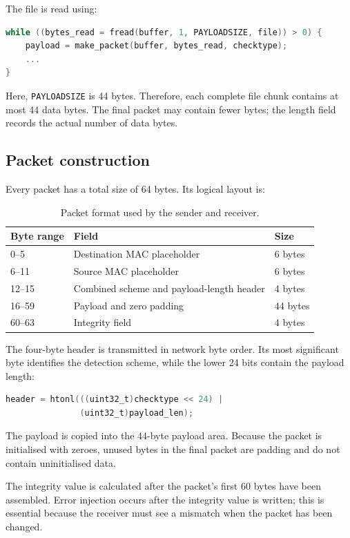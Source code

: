 \documentclass[12pt,a4paper]{article}
\begin{document}
The file is read using:

\begin{lstlisting}[language=C]
while ((bytes_read = fread(buffer, 1, PAYLOADSIZE, file)) > 0) {
    payload = make_packet(buffer, bytes_read, checktype);
    ...
}
\end{lstlisting}

Here, \texttt{PAYLOADSIZE} is 44 bytes. Therefore, each complete file chunk
contains at most 44 data bytes. The final packet may contain fewer bytes;
the length field records the actual number of data bytes.

\subsection{Packet construction}

Every packet has a total size of 64 bytes. Its logical layout is:

\begin{table}[H]
\centering
\begin{tabular}{lll}
\toprule
\textbf{Byte range} & \textbf{Field} & \textbf{Size} \\
\midrule
0--5 & Destination MAC placeholder & 6 bytes \\
6--11 & Source MAC placeholder & 6 bytes \\
12--15 & Combined scheme and payload-length header & 4 bytes \\
16--59 & Payload and zero padding & 44 bytes \\
60--63 & Integrity field & 4 bytes \\
\bottomrule
\end{tabular}
\caption{Packet format used by the sender and receiver.}
\end{table}

The four-byte header is transmitted in network byte order. Its most
significant byte identifies the detection scheme, while the lower 24 bits
contain the payload length:

\begin{lstlisting}[language=C]
header = htonl(((uint32_t)checktype << 24) |
               (uint32_t)payload_len);
\end{lstlisting}

The payload is copied into the 44-byte payload area. Because the packet is
initialised with zeroes, unused bytes in the final packet are padding and do
not contain uninitialised data.

The integrity value is calculated after the packet's first 60 bytes have
been assembled. Error injection occurs after the integrity value is written;
this is essential because the receiver must see a mismatch when the packet
has been changed.
\end{document}
